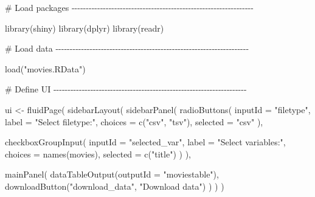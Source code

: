 \documentclass[
  letterpaper,
  DIV=11,
  numbers=noendperiod]{scrreprt}
\newenvironment{Shaded}{\begin{snugshade}}{\end{snugshade}}
\newcommand{\AttributeTok}[1]{\textcolor[rgb]{0.40,0.46,0.14}{#1}}
\newcommand{\CommentTok}[1]{\textcolor[rgb]{0.37,0.37,0.37}{#1}}
\newcommand{\FunctionTok}[1]{\textcolor[rgb]{0.28,0.35,0.67}{#1}}
\newcommand{\NormalTok}[1]{\textcolor[rgb]{0.00,0.46,0.62}{#1}}
\newcommand{\OtherTok}[1]{\textcolor[rgb]{0.00,0.46,0.62}{#1}}
\newcommand{\StringTok}[1]{\textcolor[rgb]{0.13,0.47,0.30}{#1}}
\begin{document}
\begin{Shaded}
\begin{Highlighting}[]
\CommentTok{\# Load packages {-}{-}{-}{-}{-}{-}{-}{-}{-}{-}{-}{-}{-}{-}{-}{-}{-}{-}{-}{-}{-}{-}{-}{-}{-}{-}{-}{-}{-}{-}{-}{-}{-}{-}{-}{-}{-}{-}{-}{-}{-}{-}{-}{-}{-}{-}{-}{-}{-}{-}{-}{-}{-}{-}{-}{-}{-}{-}{-}{-}{-}{-}{-}{-}}

\FunctionTok{library}\NormalTok{(shiny)}
\FunctionTok{library}\NormalTok{(dplyr)}
\FunctionTok{library}\NormalTok{(readr)}

\CommentTok{\# Load data {-}{-}{-}{-}{-}{-}{-}{-}{-}{-}{-}{-}{-}{-}{-}{-}{-}{-}{-}{-}{-}{-}{-}{-}{-}{-}{-}{-}{-}{-}{-}{-}{-}{-}{-}{-}{-}{-}{-}{-}{-}{-}{-}{-}{-}{-}{-}{-}{-}{-}{-}{-}{-}{-}{-}{-}{-}{-}{-}{-}{-}{-}{-}{-}{-}{-}{-}{-}}

\FunctionTok{load}\NormalTok{(}\StringTok{"movies.RData"}\NormalTok{)}

\CommentTok{\# Define UI {-}{-}{-}{-}{-}{-}{-}{-}{-}{-}{-}{-}{-}{-}{-}{-}{-}{-}{-}{-}{-}{-}{-}{-}{-}{-}{-}{-}{-}{-}{-}{-}{-}{-}{-}{-}{-}{-}{-}{-}{-}{-}{-}{-}{-}{-}{-}{-}{-}{-}{-}{-}{-}{-}{-}{-}{-}{-}{-}{-}{-}{-}{-}{-}{-}{-}{-}{-}}

\NormalTok{ui }\OtherTok{\textless{}{-}} \FunctionTok{fluidPage}\NormalTok{(}
  \FunctionTok{sidebarLayout}\NormalTok{(}
    \FunctionTok{sidebarPanel}\NormalTok{(}
      \FunctionTok{radioButtons}\NormalTok{(}
        \AttributeTok{inputId =} \StringTok{"filetype"}\NormalTok{,}
        \AttributeTok{label =} \StringTok{"Select filetype:"}\NormalTok{,}
        \AttributeTok{choices =} \FunctionTok{c}\NormalTok{(}\StringTok{"csv"}\NormalTok{, }\StringTok{"tsv"}\NormalTok{),}
        \AttributeTok{selected =} \StringTok{"csv"}
\NormalTok{      ),}

      \FunctionTok{checkboxGroupInput}\NormalTok{(}
        \AttributeTok{inputId =} \StringTok{"selected\_var"}\NormalTok{,}
        \AttributeTok{label =} \StringTok{"Select variables:"}\NormalTok{,}
        \AttributeTok{choices =} \FunctionTok{names}\NormalTok{(movies),}
        \AttributeTok{selected =} \FunctionTok{c}\NormalTok{(}\StringTok{"title"}\NormalTok{)}
\NormalTok{      )}
\NormalTok{    ),}

    \FunctionTok{mainPanel}\NormalTok{(}
      \FunctionTok{dataTableOutput}\NormalTok{(}\AttributeTok{outputId =} \StringTok{"moviestable"}\NormalTok{),}
      \FunctionTok{downloadButton}\NormalTok{(}\StringTok{"download\_data"}\NormalTok{, }\StringTok{"Download data"}\NormalTok{)}
\NormalTok{    )}
\NormalTok{  )}
\NormalTok{)}


\end{Highlighting}
\end{Shaded}
\end{document}
